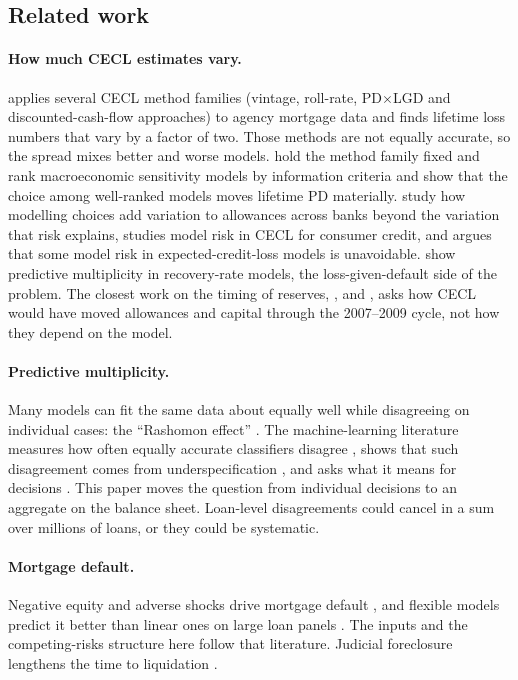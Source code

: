 \subsection{Related work}

\paragraph{How much CECL estimates vary.} \citet{breeden2017cecl} applies
several CECL method families (vintage, roll-rate, PD$\times$LGD and
discounted-cash-flow approaches) to agency mortgage data and finds lifetime
loss numbers that vary by a factor of two. Those methods are not equally
accurate, so the spread mixes better and worse models.
\citet{breeden2022selection} hold the method family fixed and rank
macroeconomic sensitivity models by information criteria and show that the
choice among well-ranked models moves lifetime PD materially.
\citet{du2018sources} study how modelling choices add variation to allowances
across banks beyond the variation that risk explains, \citet{canals2026cecl} studies model risk
in CECL for consumer credit, and \citet{forrest2024unavoidable} argues that
some model risk in expected-credit-loss models is unavoidable.
\citet{hibbeln2026multiplicity} show predictive multiplicity in recovery-rate
models, the loss-given-default side of the problem. The closest work on the
timing of reserves, \citet{chae2019cecl}, \citet{covas2018cecl} and
\citet{loudis2019cecl}, asks how CECL would have moved allowances and capital
through the 2007--2009 cycle, not how they depend on the model.

\paragraph{Predictive multiplicity.} Many models can fit the same data about
equally well while disagreeing on individual cases: the ``Rashomon effect''
\citep{breiman2001two}. The machine-learning literature measures how often
equally accurate classifiers disagree \citep{marx2020predictive,
hsu2022rashomon, watsondaniels2023prob}, shows that such disagreement comes
from underspecification \citep{damour2022underspec}, and asks what it means for
decisions \citep{black2022multiplicity, semenova2022existence,
fisher2019all}. This paper moves the question from individual decisions
to an aggregate on the balance sheet. Loan-level disagreements could cancel in
a sum over millions of loans, or they could be systematic.

\paragraph{Mortgage default.} Negative equity and adverse shocks drive
mortgage default \citep{foote2008negative, elul2010triggers,
campbell2015model}, and flexible models predict it better than linear ones on
large loan panels \citep{sadhwani2021deep, fuster2022predictably}. The inputs
and the competing-risks structure here follow that literature. Judicial
foreclosure lengthens the time to liquidation
\citep{pence2006foreclosing, gerardi2013borrower}.

